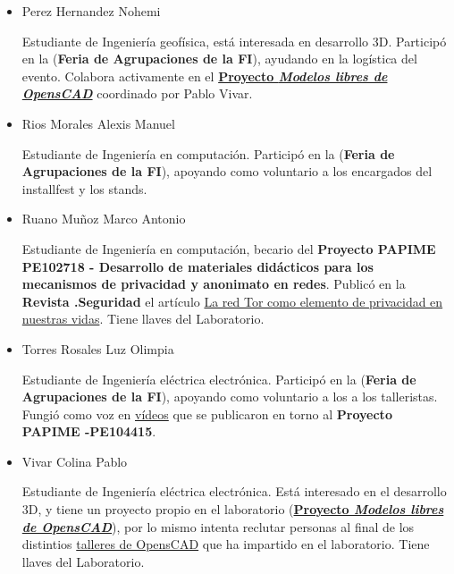 \documentclass[a4paper,11pt]{article}                 %
\begin{document}
\begin{itemize}
    \item Perez Hernandez Nohemi
    
    Estudiante de Ingeniería geofísica, está interesada en desarrollo 3D. Participó en la (\textbf{Feria de Agrupaciones de la FI}), ayudando en la logística del evento. Colabora activamente en el \href{https://github.com/LIDSOL/OpenSCAD-free-models}{\textbf{Proyecto \textit{Modelos libres de OpensCAD}}} coordinado por Pablo Vivar.
    
    \item Rios Morales Alexis Manuel
    
    Estudiante de Ingeniería en computación. Participó en la (\textbf{Feria de Agrupaciones de la FI}), apoyando como voluntario a los encargados del installfest y  los stands.
     
    \item Ruano Muñoz Marco Antonio
    
    Estudiante de Ingeniería en computación, becario del \textbf{Proyecto PAPIME PE102718 - Desarrollo de materiales didácticos para los mecanismos de privacidad y anonimato en redes}. Publicó en la \textbf{Revista .Seguridad} el artículo \href{https://revista.seguridad.unam.mx/numero30/la-red-tor-como-elemento-de-privacidad-en-nuestras-vidas}{La red Tor como elemento de privacidad en nuestras vidas}. Tiene llaves del Laboratorio.
    
    \item Torres Rosales Luz Olimpia
    
    Estudiante de Ingeniería eléctrica electrónica. Participó en la (\textbf{Feria de Agrupaciones de la FI}), apoyando como voluntario a los a los talleristas. Fungió como voz en \href{https://www.youtube.com/channel/UCwHFqMqxUcCAJSdek3e4zOw}{vídeos} que se publicaron en torno al  \textbf{Proyecto PAPIME -PE104415}.
    
    \item Vivar Colina Pablo
    
    Estudiante de Ingeniería eléctrica electrónica. Está interesado en el desarrollo 3D, y tiene un proyecto propio en el laboratorio (\href{https://github.com/LIDSOL/OpenSCAD-free-models}{\textbf{Proyecto \textit{Modelos libres de OpensCAD}}}), por lo mismo intenta reclutar personas al final de los distintios \href{https://github.com/LIDSOL/OpenSCAD-curso}{talleres de OpensCAD} que ha impartido en el laboratorio. Tiene llaves del Laboratorio.
  \end{itemize}
  
\end{document}
